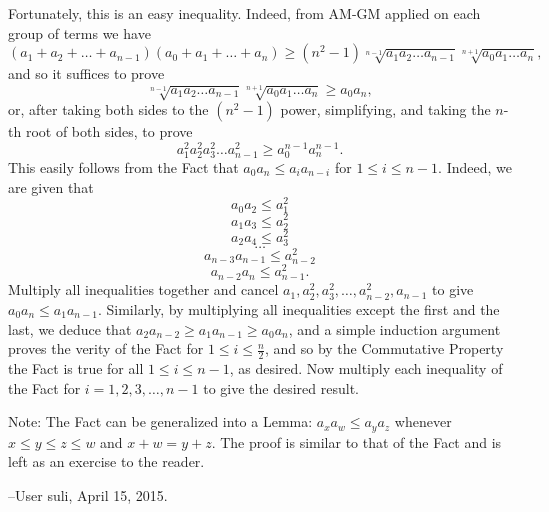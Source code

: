 \begin{enumerate}
 Fortunately, this is an easy inequality. Indeed, from AM-GM applied on each group of terms we have
 \[(a_1 + a_2 + \dots + a_{n-1})(a_0 + a_1 + \dots + a_n) \ge (n^2 - 1) \sqrt[n-1]{a_1 a_2 \dots a_{n-1}} \sqrt[n+1]{a_0 a_1 \dots a_n},\]and so it suffices to prove
 \[\sqrt[n-1]{a_1 a_2 \dots a_{n-1}} \sqrt[n+1]{a_0 a_1 \dots a_n} \ge a_0 a_n,\]or, after taking both sides to the $(n^2 - 1)$ power, simplifying, and taking the $n$-th root of both sides, to prove
 \[a_1^2 a_2^2 a_3^2 \dots a_{n-1}^2 \ge a_0^{n-1} a_n^{n-1}.\]This easily follows from the Fact that $a_0 a_n \le a_i a_{n-i}$ for $1 \le i \le n-1$. Indeed, we are given that
 \[a_0 a_2 \le a_1^2\]
 \[a_1 a_3 \le a_2^2\]
 \[a_2 a_4 \le a_3^2\]
 \[\dots\]
 \[a_{n-3} a_{n-1} \le a_{n-2}^2\]
 \[a_{n-2} a_n \le a_{n-1}^2.\]Multiply all inequalities together and cancel $a_1, a_2^2, a_3^2, \dots, a_{n-2}^2, a_{n-1}$ to give $a_0 a_n \le a_1 a_{n-1}$. Similarly, by multiplying all inequalities except the first and the last, we deduce that $a_2 a_{n-2} \ge a_1 a_{n-1} \ge a_0 a_n$, and a simple induction argument proves the verity of the Fact for $1 \le i \le \frac{n}{2}$, and so by the Commutative Property the Fact is true for all $1 \le i \le n-1$, as desired. Now multiply each inequality of the Fact for $i = 1, 2, 3, \dots, n-1$ to give the desired result.

 Note: The Fact can be generalized into a Lemma: $a_x a_w \le a_y a_z$ whenever $x \le y \le z \le w$ and $x + w = y + z$. The proof is similar to that of the Fact and is left as an exercise to the reader.

 --User suli, April 15, 2015.

 


\end{enumerate}